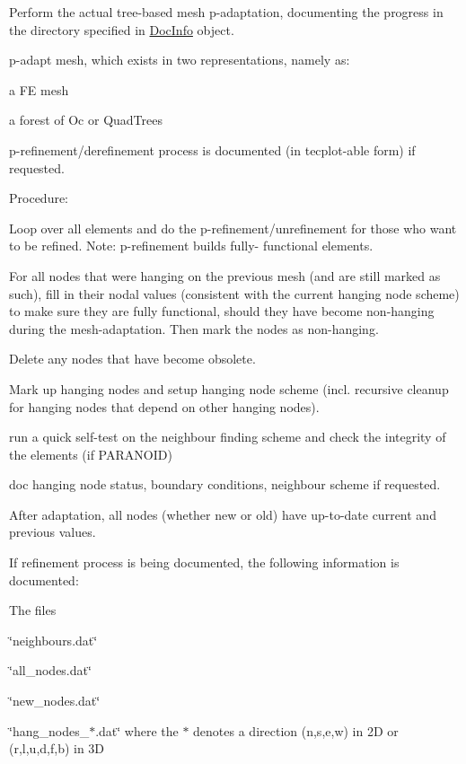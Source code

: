 Perform the actual tree-\/based mesh p-\/adaptation, documenting the progress in the directory specified in \hyperlink{classoomph_1_1DocInfo}{Doc\+Info} object. 

p-\/adapt mesh, which exists in two representations, namely as\+:
\begin{DoxyItemize}
\item a FE mesh
\item a forest of Oc or Quad\+Trees
\end{DoxyItemize}

p-\/refinement/derefinement process is documented (in tecplot-\/able form) if requested.

Procedure\+:
\begin{DoxyItemize}
\item Loop over all elements and do the p-\/refinement/unrefinement for those who want to be refined. Note\+: p-\/refinement builds fully-\/ functional elements.
\item For all nodes that were hanging on the previous mesh (and are still marked as such), fill in their nodal values (consistent with the current hanging node scheme) to make sure they are fully functional, should they have become non-\/hanging during the mesh-\/adaptation. Then mark the nodes as non-\/hanging.
\item Delete any nodes that have become obsolete.
\item Mark up hanging nodes and setup hanging node scheme (incl. recursive cleanup for hanging nodes that depend on other hanging nodes).
\item run a quick self-\/test on the neighbour finding scheme and check the integrity of the elements (if P\+A\+R\+A\+N\+O\+ID)
\item doc hanging node status, boundary conditions, neighbour scheme if requested.
\end{DoxyItemize}

After adaptation, all nodes (whether new or old) have up-\/to-\/date current and previous values.

If refinement process is being documented, the following information is documented\+:
\begin{DoxyItemize}
\item The files
\begin{DoxyItemize}
\item \char`\"{}neighbours.\+dat\char`\"{}
\item \char`\"{}all\+\_\+nodes.\+dat\char`\"{}
\item \char`\"{}new\+\_\+nodes.\+dat\char`\"{}
\item \char`\"{}hang\+\_\+nodes\+\_\+$\ast$.\+dat\char`\"{} where the $\ast$ denotes a direction (n,s,e,w) in 2D or (r,l,u,d,f,b) in 3D
\end{DoxyItemize}
\end{DoxyItemize}

